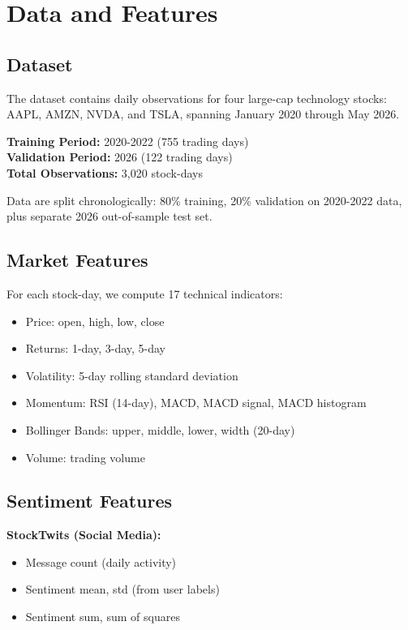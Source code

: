 \documentclass[10pt,twocolumn]{article}
\begin{document}
\section{Data and Features}

\subsection{Dataset}

The dataset contains daily observations for four large-cap technology stocks: AAPL, AMZN, NVDA, and TSLA, spanning January 2020 through May 2026.

\textbf{Training Period:} 2020-2022 (755 trading days)\\
\textbf{Validation Period:} 2026 (122 trading days)\\
\textbf{Total Observations:} 3,020 stock-days

Data are split chronologically: 80\% training, 20\% validation on 2020-2022 data, plus separate 2026 out-of-sample test set.

\subsection{Market Features}

For each stock-day, we compute 17 technical indicators:
\begin{itemize}
\item Price: open, high, low, close
\item Returns: 1-day, 3-day, 5-day
\item Volatility: 5-day rolling standard deviation
\item Momentum: RSI (14-day), MACD, MACD signal, MACD histogram
\item Bollinger Bands: upper, middle, lower, width (20-day)
\item Volume: trading volume
\end{itemize}

\subsection{Sentiment Features}

\textbf{StockTwits (Social Media):}
\begin{itemize}
\item Message count (daily activity)
\item Sentiment mean, std (from user labels)
\item Sentiment sum, sum of squares
\end{itemize}
\end{document}
